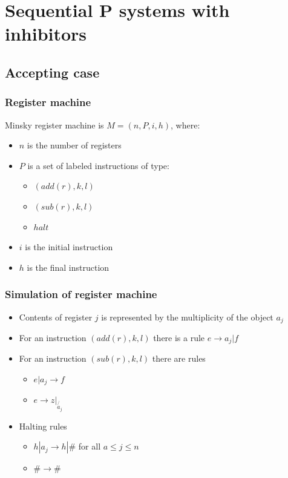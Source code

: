 

\section{Sequential P systems with inhibitors} %
\label{sec:sequential_p_systems_with_inhibitors}

  \subsection{Accepting case} %
  \label{sub:accepting_case}
  
    \begin{frame}[t]\frametitle{Register machine}
      Minsky register machine is $M=(n,P,i,h)$, where:
      \begin{itemize}
        \item $n$ is the number of registers
        \item $P$ is a set of labeled instructions of type:
          \begin{itemize}
            \item $(add(r),k,l)$
            \item $(sub(r),k,l)$
            \item $halt$
          \end{itemize}
        \item $i$ is the initial instruction
        \item $h$ is the final instruction
      \end{itemize}
    \end{frame}
    \note{}

    \begin{frame}[t]\frametitle{Simulation of register machine}
      \begin{itemize}
        \item Contents of register $j$ is represented by the multiplicity of the object $a_j$
        \item For an instruction $(add(r),k,l)$ there is a rule $e\rightarrow a_j|f$
        \item For an instruction $(sub(r),k,l)$ there are rules
          \begin{itemize}
            \item $e|a_j\rightarrow f$
            \item $e\rightarrow z|_\not{a_j}$
          \end{itemize}
        \item Halting rules
          \begin{itemize}
            \item $h|a_j\rightarrow h|\#$ for all $a\leq j\leq n$
            \item $\#\rightarrow\#$
          \end{itemize}
      \end{itemize}
    \end{frame}
    \note{}

